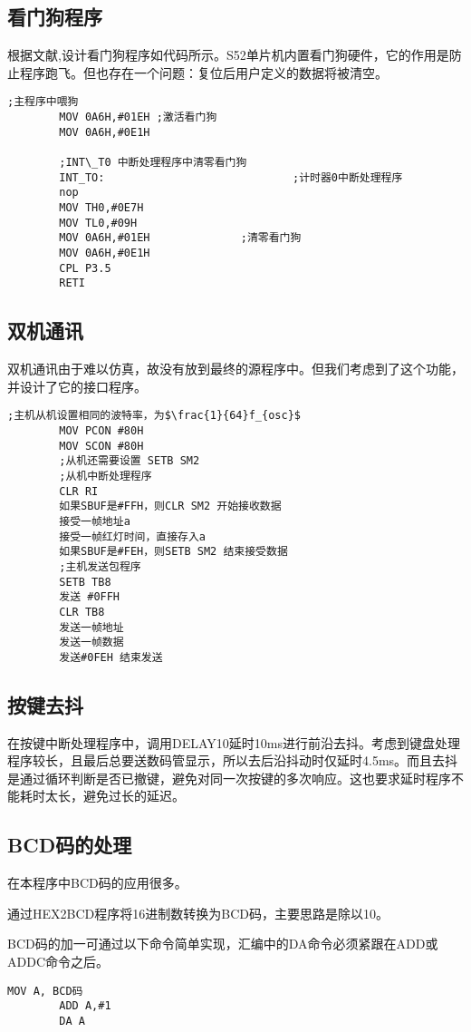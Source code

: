 \subsection{看门狗程序}
根据文献\cite{mcu1},设计看门狗程序如代码所示。S52单片机内置看门狗硬件，它的作用是防止程序跑飞。但也存在一个问题：复位后用户定义的数据将被清空。
\begin{lstlisting}[language={[x86masm]assembler},escapeinside="",caption={看门狗程序}] 
		;主程序中喂狗
		MOV 0A6H,#01EH ;激活看门狗
		MOV 0A6H,#0E1H
		
		;INT\_T0 中断处理程序中清零看门狗
		INT_TO:								;计时器0中断处理程序
		nop
		MOV TH0,#0E7H 				
		MOV TL0,#09H
		MOV 0A6H,#01EH 				;清零看门狗
		MOV 0A6H,#0E1H 
		CPL P3.5
		RETI
\end{lstlisting} 
\subsection{双机通讯}
双机通讯由于难以仿真，故没有放到最终的源程序中。但我们考虑到了这个功能，并设计了它的接口程序。
\begin{lstlisting}[language={[x86masm]assembler},escapeinside="",caption={双机通训代码}] 
		;主机从机设置相同的波特率，为$\frac{1}{64}f_{osc}$
		MOV PCON #80H
		MOV SCON #80H
		;从机还需要设置 SETB SM2
		;从机中断处理程序
		CLR RI
		如果SBUF是#FFH，则CLR SM2 开始接收数据
		接受一帧地址a
		接受一帧红灯时间，直接存入a
		如果SBUF是#FEH，则SETB SM2 结束接受数据
		;主机发送包程序
		SETB TB8
		发送 #0FFH
		CLR TB8
		发送一帧地址
		发送一帧数据
		发送#0FEH 结束发送
\end{lstlisting}
\subsection{按键去抖}
在按键中断处理程序中，调用DELAY10延时10ms进行前沿去抖。考虑到键盘处理程序较长，且最后总要送数码管显示，所以去后沿抖动时仅延时4.5ms。而且去抖是通过循环判断是否已撤键，避免对同一次按键的多次响应。这也要求延时程序不能耗时太长，避免过长的延迟。
\subsection{BCD码的处理}
在本程序中BCD码的应用很多。

通过HEX2BCD程序将16进制数转换为BCD码，主要思路是除以10。

BCD码的加一可通过以下命令简单实现，汇编中的DA命令必须紧跟在ADD或ADDC命令之后。 
\begin{lstlisting}[language={[x86masm]assembler},escapeinside="",caption={BCD码加一，结果存入ACC}] 
		MOV A, BCD码
		ADD A,#1
		DA A
\end{lstlisting}

